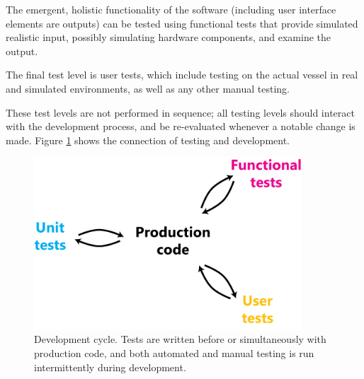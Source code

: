 The emergent, holistic functionality of the software (including user interface elements are outputs) can be tested using functional tests that provide simulated realistic input, possibly simulating hardware components, and examine the output.

The final test level is user tests, which include testing on the actual vessel in real and simulated environments, as well as any other manual testing.

These test levels are not performed in sequence; all testing levels should interact with the development process, and be re-evaluated whenever a notable change is made. Figure \ref{fig:software-testing} shows the connection of testing and development.

\begin{figure}
\includegraphics[width=100mm,natwidth=494,natheight=299]{"./image/software-testing"}
\caption[Software development cycle]{\label{fig:software-testing}Development cycle. Tests are written before or simultaneously with production code, and both automated and manual testing is run intermittently during development.}
\end{figure}
